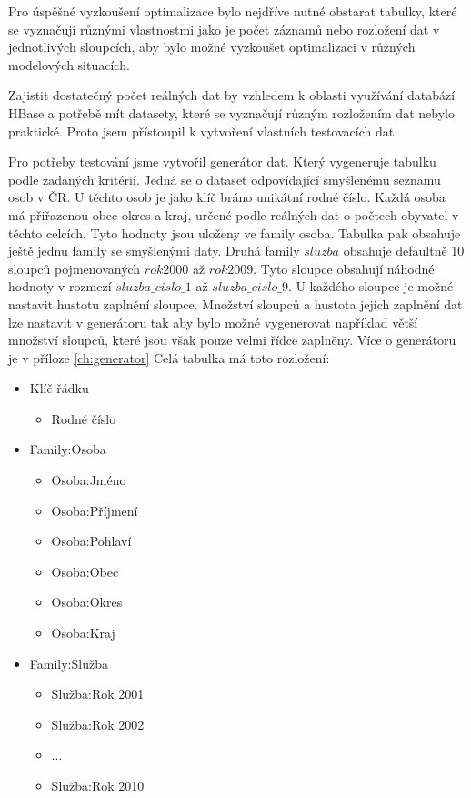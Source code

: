 \documentclass[thesis=M,czech]{FITthesis}[2012/06/26]
\begin{document}
Pro úspěšné vyzkoušení optimalizace bylo nejdříve nutné obstarat tabulky, které se vyznačují různými vlastnostmi jako je počet záznamů nebo rozložení dat v jednotlivých sloupcích, aby bylo možné vyzkoušet optimalizaci v různých modelových situacích.

Zajistit dostatečný počet reálných dat by vzhledem k oblasti využívání databází HBase a potřebě mít datasety, které se vyznačují různým rozložením dat nebylo praktické. Proto jsem přístoupil k vytvoření vlastních testovacích dat. 

Pro potřeby testování jsme vytvořil generátor dat. Který vygeneruje tabulku podle zadaných kritérií. Jedná se o dataset odpovídající smyšlenému seznamu osob v ČR. U těchto osob je jako klíč bráno unikátní rodné číslo. Každá osoba má přiřazenou obec okres a kraj, určené podle reálných dat o počtech obyvatel v těchto celcích. Tyto hodnoty jsou uloženy ve family osoba. Tabulka pak obsahuje ještě jednu family se smyšlenými daty. Druhá family $sluzba$ obsahuje defaultně 10 sloupců pojmenovaných $rok2000$ až $rok2009$. Tyto sloupce obsahují náhodné hodnoty v rozmezí $sluzba\_cislo\_1$ až $sluzba\_cislo\_9$. U každého sloupce je možné nastavit hustotu zaplnění sloupce. Množství sloupců a hustota jejich zaplnění dat lze nastavit v generátoru tak  aby bylo možné vygenerovat například větší množství sloupců, které jsou však pouze velmi řídce zaplněny. Více o generátoru je v příloze \ref{ch:generator} Celá tabulka má toto rozložení:


\begin{itemize}
\item Klíč řádku
\begin{itemize}
\item Rodné číslo
\end{itemize}
\item Family:Osoba
\begin{itemize}
\item Osoba:Jméno
\item Osoba:Příjmení
\item Osoba:Pohlaví
\item Osoba:Obec
\item Osoba:Okres
\item Osoba:Kraj
\end{itemize}
\item Family:Služba
\begin{itemize}
\item Služba:Rok 2001
\item Služba:Rok 2002
\item ...
\item Služba:Rok 2010
\end{itemize}
\end{itemize}
\end{document}
